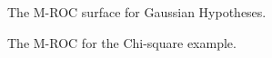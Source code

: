 \documentclass[12pt,journal,a4paper,twoside,onecolumn]{IEEEtran}
\begin{document}
\begin{spacing}{2}
\begin{figure}[!h]
           \begin{floatrow}
			 {\caption{The M-ROC surface for Gaussian Hypotheses.}
			\label{pic: LJS}
             }
			       {\caption{The M-ROC for the Chi-square example.}
              \label{pic: LJS for chisquare}
             }
           \end{floatrow}
\end{figure}


\end{spacing}
\end{document}
